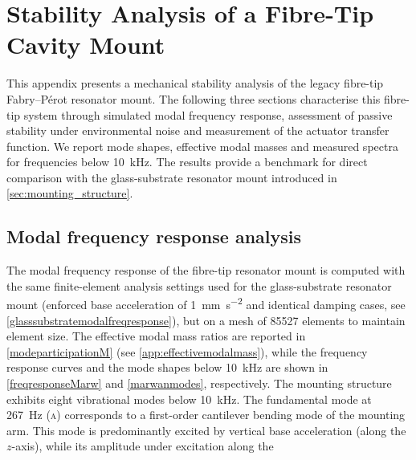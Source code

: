 \documentclass[../Thesis-IJspeert.tex]{subfiles}
\begin{document}
\chapter{Stability Analysis of a Fibre-Tip Cavity Mount}
\label{app:legacymount}
This appendix presents a mechanical stability analysis of the legacy fibre-tip Fabry--Pérot resonator mount. The following three sections characterise this fibre-tip system through simulated modal frequency response, assessment of passive stability under environmental noise and measurement of the actuator transfer function. We report mode shapes, effective modal masses and measured spectra for frequencies below \SI{10}{\kilo\hertz}. The results provide a benchmark for direct comparison with the glass-substrate resonator mount introduced in \autoref{sec:mounting_structure}.

\section{Modal frequency response analysis}
\label{modalfreqresponseanalysisfibretip}
\startsquarepar
The modal frequency response of the fibre-tip resonator mount is computed with the same finite-element analysis settings used for the glass-substrate resonator mount (enforced base acceleration of \SI{1}{\milli\metre\per\second\squared} and identical damping cases, see \autoref{glasssubstratemodalfreqresponse}), but on a mesh of \num{85527} elements to maintain element size. The effective modal mass ratios are reported in \autoref{modeparticipationM} (see \autoref{app:effectivemodalmass}), while the frequency response curves and the mode shapes below \SI{10}{\kilo\hertz} are shown in \autoref{freqresponseMarw} and \autoref{marwanmodes}, respectively. The mounting structure exhibits eight vibrational modes below \SI{10}{\kilo\hertz}. The fundamental mode at \SI{267}{\hertz} \textsc{(a)} corresponds to a first-order cantilever bending mode of the mounting arm. This mode is predominantly excited by vertical base acceleration (along the $z$-axis), while its amplitude under excitation along the
\stopsquarepar
\end{document}
